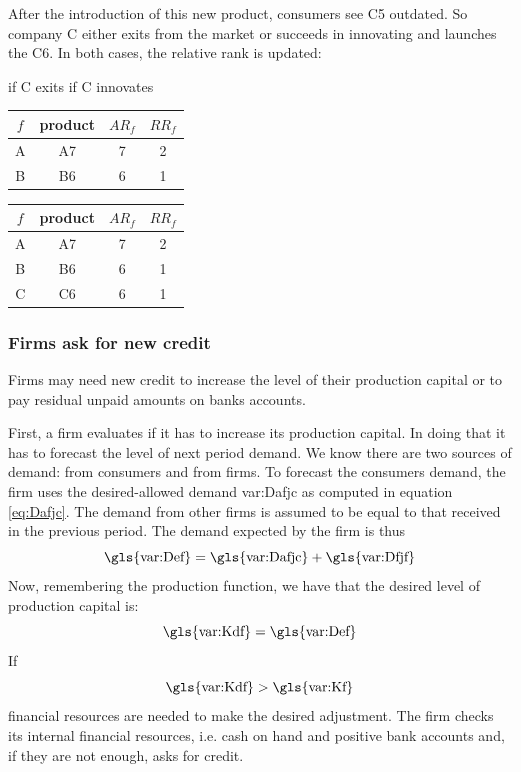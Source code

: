 \documentclass{book}
\begin{document}
After the introduction of this new product, consumers see C5 outdated. So company C either exits from the market or succeeds in innovating and launches the C6. In both cases, the relative rank is updated: 
\begin{center}
\hskip1cm if C exits \hskip5cm if C innovates

\begin{tabular}[t]{c c c c}
	\hline
	$f$ & product & $AR_f$ & $RR_f$\\
	\hline
	A & A7 & 7 & 2\\
	B & B6 & 6 & 1\\
	\hline
\end{tabular}
\hskip2cm
\begin{tabular}[t]{c c c c}
	\hline
	$f$ & product & $AR_f$ & $RR_f$\\
	\hline
	A & A7 & 7 & 2\\
	B & B6 & 6 & 1\\
	C & C6 & 6 & 1\\
	\hline
\end{tabular}

\end{center}



\subsubsection{Firms ask for new credit}

Firms may need new credit to increase the level of their production capital or to pay residual unpaid amounts on banks accounts.

First, a firm evaluates if it has to increase its production capital. In doing that it has to forecast the level of next period demand. We know there are two sources of demand: from consumers and from firms. To forecast the consumers demand, the firm uses the desired-allowed demand \gls{var:Dafjc} as computed in equation \ref{eq:Dafjc}.   
The demand from other firms is assumed to be equal to that received in the previous period. The demand expected by the firm is thus
\[
	\textnormal{\gls{var:Def}}=\textnormal{\gls{var:Dafjc}}+\textnormal{\gls{var:Dfjf}}
\]
Now, remembering the production function, we have that the desired level of production capital is:
\[
	\textnormal{\gls{var:Kdf}}=\textnormal{\gls{var:Def}}
\]
If 
\[
\textnormal{\gls{var:Kdf}}>\textnormal{\gls{var:Kf}}
\]
financial resources are needed to make the desired adjustment. The firm checks its internal financial resources, i.e. cash on hand and positive bank accounts and, if they are not enough, asks for credit. 
\end{document}
